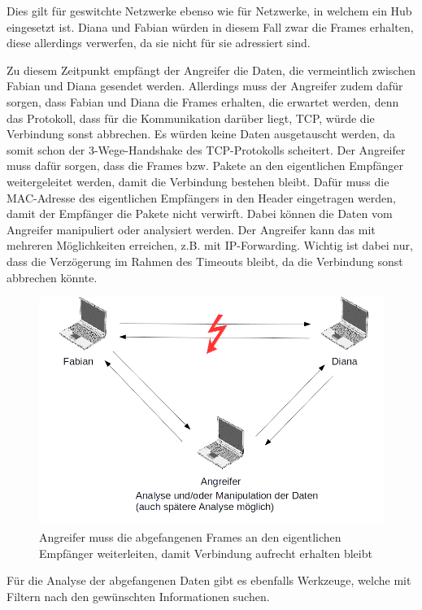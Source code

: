 Dies gilt für geswitchte Netzwerke ebenso wie für Netzwerke, in welchem ein Hub eingesetzt ist. Diana und Fabian würden in diesem Fall zwar die Frames erhalten, diese allerdings verwerfen, da sie nicht für sie adressiert sind.

Zu diesem Zeitpunkt empfängt der Angreifer die Daten, die vermeintlich zwischen Fabian und Diana gesendet werden. Allerdings muss der Angreifer zudem dafür sorgen, dass Fabian und Diana die Frames erhalten, die erwartet werden, denn das Protokoll, dass für die Kommunikation darüber liegt, TCP, würde die Verbindung sonst abbrechen. Es würden keine Daten ausgetauscht werden, da somit schon der 3-Wege-Handshake des TCP-Protokolls scheitert.
Der Angreifer muss dafür sorgen, dass die Frames bzw. Pakete an den eigentlichen Empfänger weitergeleitet werden, damit die Verbindung bestehen bleibt. Dafür muss die MAC-Adresse des eigentlichen Empfängers in den Header eingetragen werden, damit der Empfänger die Pakete nicht verwirft. Dabei können die Daten vom Angreifer manipuliert oder analysiert werden. Der Angreifer kann das mit mehreren Möglichkeiten erreichen, z.B. mit IP-Forwarding. Wichtig ist dabei nur, dass die Verzögerung im Rahmen des Timeouts bleibt, da die Verbindung sonst abbrechen könnte.
\begin{figure}[H]
	\centering
	\includegraphics[width=1\linewidth]{images/ARP-Tabelle-manipuliert_1.png}
	\caption{Angreifer muss die abgefangenen Frames an den eigentlichen Empfänger weiterleiten, damit Verbindung aufrecht erhalten bleibt \cite{ARP-Tabelle-Bild-2} }
\end{figure}
Für die Analyse der abgefangenen Daten gibt es ebenfalls Werkzeuge, welche mit Filtern nach den gewünschten Informationen suchen.


